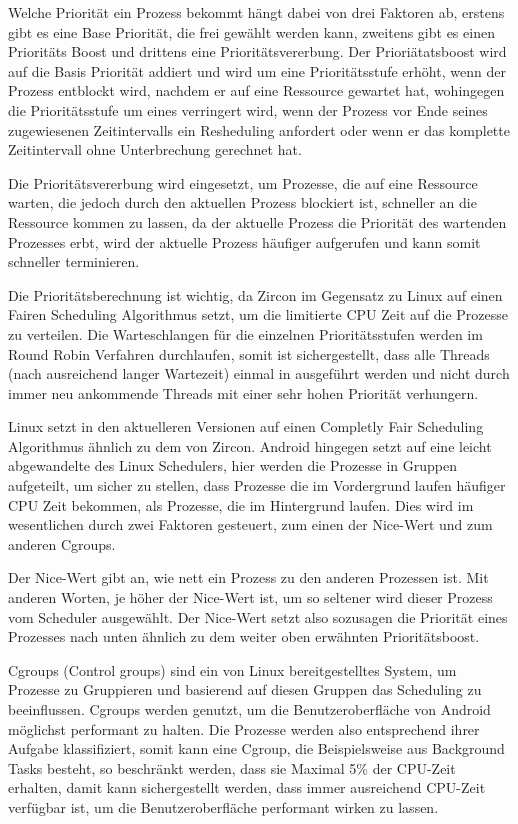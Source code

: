 \documentclass[a4paper]{scrartcl}
\begin{document}
Welche Priorität ein Prozess bekommt hängt dabei von drei Faktoren ab, erstens gibt es eine Base Priorität, die frei gewählt werden kann, zweitens gibt es einen Prioritäts Boost und drittens eine Prioritätsvererbung. Der Prioriätatsboost wird auf die Basis Priorität addiert und wird um eine Prioritätsstufe erhöht, wenn der Prozess entblockt wird, nachdem er auf eine Ressource gewartet hat, wohingegen die Prioritätsstufe um eines verringert wird, wenn der Prozess vor Ende seines zugewiesenen Zeitintervalls ein Resheduling anfordert oder wenn er das komplette Zeitintervall ohne Unterbrechung gerechnet hat.\cite{Fuchsia.Zircon.Scheduling}

Die Prioritätsvererbung wird eingesetzt, um Prozesse, die auf eine Ressource warten, die jedoch durch den aktuellen Prozess blockiert ist, schneller an die Ressource kommen zu lassen, da der aktuelle Prozess die Priorität des wartenden Prozesses erbt, wird der aktuelle Prozess häufiger aufgerufen und kann somit schneller terminieren.\cite{Fuchsia.Zircon.Scheduling}

Die Prioritätsberechnung ist wichtig, da Zircon im Gegensatz zu Linux auf einen Fairen Scheduling Algorithmus setzt, um die limitierte CPU Zeit auf die Prozesse zu verteilen. Die Warteschlangen für die einzelnen Prioritätsstufen werden im Round Robin Verfahren durchlaufen, somit ist sichergestellt, dass alle Threads (nach ausreichend langer Wartezeit) einmal in ausgeführt werden und nicht durch immer neu ankommende Threads mit einer sehr hohen Priorität verhungern. \cite{Fuchsia.Zircon.FairScheduler}

Linux setzt in den aktuelleren Versionen auf einen Completly Fair Scheduling Algorithmus ähnlich zu dem von Zircon. Android hingegen setzt auf eine leicht abgewandelte des Linux Schedulers, hier werden die Prozesse in Gruppen aufgeteilt, um sicher zu stellen, dass Prozesse die im Vordergrund laufen häufiger CPU Zeit bekommen, als Prozesse, die im Hintergrund laufen. Dies wird im wesentlichen durch zwei Faktoren gesteuert, zum einen der Nice-Wert und zum anderen Cgroups.

Der Nice-Wert gibt an, wie nett ein Prozess zu den anderen Prozessen ist. Mit anderen Worten, je höher der Nice-Wert ist, um so seltener wird dieser Prozess vom Scheduler ausgewählt. Der Nice-Wert setzt also sozusagen die Priorität eines Prozesses nach unten ähnlich zu dem weiter oben erwähnten Prioritätsboost.

Cgroups (Control groups) sind ein von Linux bereitgestelltes System, um Prozesse zu Gruppieren und basierend auf diesen Gruppen das Scheduling zu beeinflussen. Cgroups werden genutzt, um die Benutzeroberfläche von Android möglichst performant zu halten. Die Prozesse werden also entsprechend ihrer Aufgabe klassifiziert, somit kann eine Cgroup, die Beispielsweise aus Background Tasks besteht, so beschränkt werden, dass sie Maximal 5\% der CPU-Zeit erhalten, damit kann sichergestellt werden, dass immer ausreichend CPU-Zeit verfügbar ist, um die Benutzeroberfläche performant wirken zu lassen.
\end{document}
